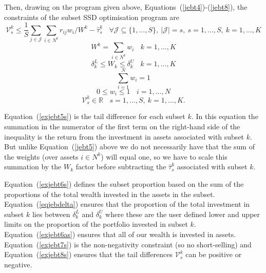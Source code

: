 Then, drawing on the program given above, Equations~(\ref{jebt4})-(\ref{jebt8}), the constraints of the subset SSD optimisation program are
\begin{equation}
\mathcal{V}_s^k \leq \frac{1}{S} \sum_{j \in \mathcal{J}} \sum_{i \in N^k} r_{ij} w_i /W^k- \hat{\tau}_s^k~~~~\forall \mathcal{J} \subseteq \{1, ..., S\},~|\mathcal{J}| = s,~s=1,\ldots,S,~k=1,\ldots,K
\label{exjebt5s}
\end{equation}
\begin{equation}
 W^k = \sum_{i \in N^k} w_i~~~~k=1,\ldots,K
\label{exjebt6s}
\end{equation}
\begin{equation}
\delta^L_k \leq W_k \leq \delta^U_k~~~~k=1,\ldots,K
\label{eqjebdelta}
\end{equation}
\begin{equation}
 \sum_{i=1}^N w_i =1
\label{exjebt6as}
\end{equation}
\begin{equation}
0 \leq w_i \leq 1~~~~i=1,\ldots,N
\label{exjebt7s}
\end{equation}
\begin{equation}
\mathcal{V}_s^k \in\mathbb{R}~~~~s=1,\ldots,S,~k=1,\ldots,K.
\label{exjebt8s}
\end{equation}

Equation~(\ref{exjebt5s}) is the tail difference for each subset $k$. In this equation the summation in the numerator of the first 
term on the right-hand side of the inequality is the return from the investment in assets associated with subset $k$. But unlike 
Equation~(\ref{jebt5}) above we do not necessarily have that the sum of the weights (over assets $i \in N^k$) will equal one, 
so we have to scale this summation by the $W_k$ factor before subtracting the $ \hat{\tau}_s^k$ associated with subset $k$.

Equation~(\ref{exjebt6s}) defines the subset proportion  based on the sum of the proportions of the total wealth invested in the assets in the subset. 
Equation~(\ref{eqjebdelta}) ensures that the proportion of the total investment in subset $k$ lies between   $\delta^L_k$ and $\delta^U_k$ where these are
the user defined lower and upper limits on the proportion of the portfolio invested in subset $k$.
Equation~(\ref{exjebt6as}) ensures that all of our wealth is invested in assets.
Equation~(\ref{exjebt7s}) is the non-negativity constraint 
(so no short-selling) and Equation~(\ref{exjebt8s}) ensures that the tail differences $\mathcal{V}^k_s$ can be positive or negative.


